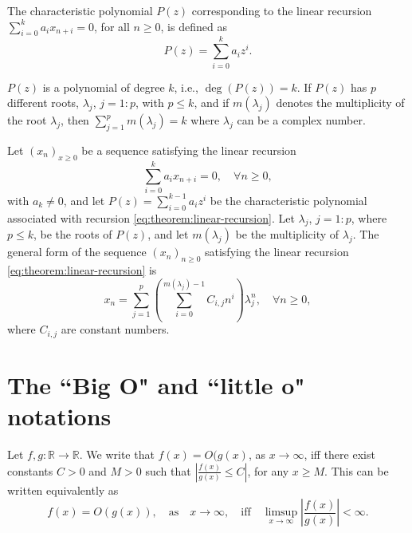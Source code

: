 \begin{definition}
    The characteristic polynomial $ P(z) $ corresponding to the linear recursion $ \sum_{i=0}^{k} a_i x_{n+i} = 0 $, for all $ n \geq 0 $, is defined as
    \begin{equation}
        P(z) = \sum_{i=0}^{k} a_i z^i.
    \end{equation}
\end{definition}

$ P(z) $ is a polynomial of degree $ k $, i.e., $ \deg(P(z)) = k $.
If $ P(z) $ has $ p $ different roots, $ \lambda_j $, $ j = 1 : p $, with $ p \leq k $, and if $ m(\lambda_j) $ denotes the multiplicity of the root $ \lambda_j $, then $ \sum_{j=1}^{p} m(\lambda_j) = k $ where $ \lambda_j $ can be a complex number.

\begin{theorem}\label{thm:linear-recursion}
    Let $ (x_n)_{x \geq 0} $ be a sequence satisfying the linear recursion
    \begin{equation}
        \sum_{i=0}^{k} a_i x_{n+i} = 0, \quad \forall n \geq 0,
        \label{eq:theorem:linear-recursion}
    \end{equation}
    with $ a_k \neq 0 $, and let $ P(z) = \sum_{i=0}^{k-1} a_i z^i $ be the characteristic polynomial associated with recursion \eqref{eq:theorem:linear-recursion}.
    Let $ \lambda_j $, $ j = 1 : p $, where $ p \leq k $, be the roots of $ P(z) $, and let $ m(\lambda_j) $ be the multiplicity of $ \lambda_j $.
    The general form of the sequence $ (x_n)_{n \geq 0} $ satisfying the linear
    recursion \eqref{eq:theorem:linear-recursion} is
    \begin{equation}
        x_n = \sum_{j=1}^{p} \left( \sum_{i=0}^{m(\lambda_j)-1} C_{i,j} n^i \right) \lambda_j^n, \quad \forall n \geq 0,
        \label{eq:theorem:linear-recursion-sequence}
    \end{equation}
    where $ C_{i,j} $ are constant numbers.
\end{theorem}

\section{The ``Big O" and ``little o" notations}
\begin{definition}
    Let $ f,g : \mathbb{R} \rightarrow \mathbb{R} $.
    We write that $ f(x) = O(g(x) $, as $ x \rightarrow \infty $, iff there exist constants $ C > 0 $ and $ M > 0 $ such that $ \left| \frac{f(x)}{g(x)} \leq C \right| $, for any $ x \geq M $.
    This can be written equivalently as
    \begin{equation}
        f(x) = O(g(x)), \quad \text{as} \quad x \rightarrow \infty, \quad \text{iff} \quad \limsup_{x \rightarrow \infty} \left| \frac{f(x)}{g(x)} \right| < \infty.
        \label{eq:definition:big-o}
    \end{equation}
\end{definition}

